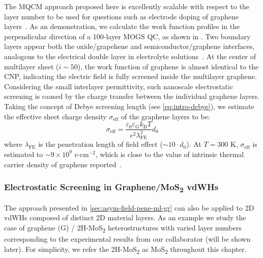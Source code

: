 The MQCM approach proposed here is excellently scalable with respect
to the layer number to be used for questions such as electrode doping
of graphene
layers~\cite{Pi_2009_metal_doping_gr,Giovannetti_2008_doping}.
%
As an demonstration, we calculate the work function profiles in the
perpendicular direction of a 100-layer MOGS QC, as shown in
.
%
Two boundary layers appear both the oxide/grapehene and
semiconductor\allowbreak{}/graphene interfaces, analogous to the
electrical double layer in electrolyte
solutions~\cite{Bard_1980_electrochem_book}.
%
At the center of multilayer sheet ($i \sim{} 50$), the work function
of graphene is almost identical to the CNP, indicating the electric
field is fully screened inside the multilayer graphene.
%
Considering the small interlayer permittivity, such nano\-scale
electrostatic screening is caused by the charge transfer between the
individual graphene layers.
%
Taking the concept of Debye screening length (see
\autoref{eq:intro-debye}), we estimate the
effective sheet charge density $\sigma_{\mathrm{eff}}$ of the graphene layers to be:
\begin{equation}
\label{eq:asym-debye}
\sigma_{\mathrm{eff}} = \dfrac{\varepsilon_{0} \varepsilon_{\mathrm{G}} k_{\mathrm{B}} T}{e^{2} \lambda_{\mathrm{FE}}^{2}} d_{0}
\end{equation}
where $\lambda_{\mathrm{FE}}$ is the penetration length of field
effect ($\sim{}10\cdot{}d_{0}$). At $T=300$ K, $\sigma_{\mathrm{eff}}$
is estimated to $\sim{}9\times10^{9}$ e$\cdot$cm$^{-2}$, which is
close to the value of intrinsic thermal carrier density of graphene
reported~\cite{Fang_2007_carrier_graphene}.


\subsubsection{Electrostatic Screening in Graphene/MoS\textsubscript{2} vdWHs}
\label{sec:asym-classic}

The approach presented in \autoref{sec:asym-field-pene-ml-gr} can also be applied to 2D vdWHs composed of distinct 2D material layers.
%
As an example we study the case of graphene (G) /
2H-MoS\textsubscript{2} heterostructures with varied layer numbers
corresponding to the experimental results from our collaborator (will
be shown later).
%
For simplicity, we refer the 2H-MoS\textsubscript{2} as
MoS\textsubscript{2} throughout this chapter.
%

